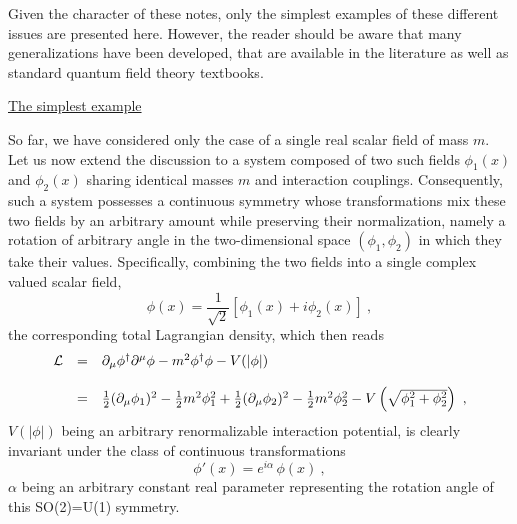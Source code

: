 \documentclass[a4paper,11pt]{article}
\begin{document}
Given the character of these notes, only the simplest examples of these
different issues are presented here. However, the reader should be aware
that many generalizations have been developed, that are available in the
literature as well as standard quantum field theory textbooks.

\vspace{10pt}

\noindent\underline{The simplest example}

\vspace{5pt}

So far, we have considered only the case of a single real scalar field
of mass $m$. Let us now extend the discussion to a system composed of two 
such fields $\phi_1(x)$ and $\phi_2(x)$ sharing identical masses $m$ and 
interaction couplings. Consequently, such a system possesses a continuous 
symmetry whose transformations mix these two fields by an arbitrary amount 
while preserving their normalization, namely a rotation of arbitrary angle in
the two-dimensional space $(\phi_1,\phi_2)$ in which they take their values.
Specifically, combining the two fields into a single complex valued
scalar field,
\begin{equation}
\phi(x)=\frac{1}{\sqrt{2}}\left[\phi_1(x)+i\phi_2(x)\right]\ ,
\end{equation}
the corresponding total Lagrangian density, which then reads
\begin{equation}
\begin{array}{r c l}
{\cal L}&=&\partial_\mu\phi^\dagger\partial^\mu\phi-m^2\phi^\dagger\phi-
V(|\phi|)\\
 & & \\
&=&\frac{1}{2}(\partial_\mu\phi_1)^2-\frac{1}{2}m^2\phi^2_1+
\frac{1}{2}(\partial_\mu\phi_2)^2-\frac{1}{2}m^2\phi^2_2-
V\left(\sqrt{\phi^2_1+\phi^2_2}\right)\ ,
\end{array}
\label{eq:Lphi}
\end{equation}
$V(|\phi|)$ being an arbitrary renormalizable interaction potential,
is clearly invariant under the class of continuous transformations
\begin{equation}
\phi'(x)=e^{i\alpha}\,\phi(x)\ ,
\label{eq:symU(1)}
\end{equation}
$\alpha$ being an arbitrary constant real parameter representing the
rotation angle of this SO(2)=U(1) symmetry.
\end{document}
